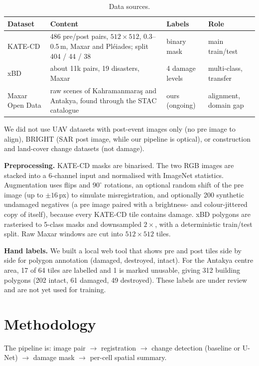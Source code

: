 \documentclass[14pt]{article}
\begin{document}
\begin{table}[H]
\centering\small
\caption{Data sources.}\label{tab:data}
\begin{tabularx}{\linewidth}{@{}lXll@{}}
\toprule
Dataset & Content & Labels & Role\\
\midrule
KATE-CD & 486 pre/post pairs, $512{\times}512$, 0.3--0.5\,m, Maxar and Pl\'eiades; split 404 / 44 / 38 & binary mask & main train/test\\
xBD & about 11k pairs, 19 disasters, Maxar & 4 damage levels & multi-class, transfer\\
Maxar Open Data & raw scenes of Kahramanmara\c{s} and Antakya, found through the STAC catalogue & ours (ongoing) & alignment, domain gap\\
\bottomrule
\end{tabularx}
\end{table}

We did not use UAV datasets with post-event images only (no pre image to align), BRIGHT (SAR post image, while our pipeline is optical), or construction and land-cover change datasets (not damage).

\textbf{Preprocessing.} KATE-CD masks are binarised. The two RGB images are stacked into a 6-channel input and normalised with ImageNet statistics. Augmentation uses flips and $90^\circ$ rotations, an optional random shift of the pre image (up to $\pm16$\,px) to simulate misregistration, and optionally 200 synthetic undamaged negatives (a pre image paired with a brightness- and colour-jittered copy of itself), because every KATE-CD tile contains damage. xBD polygons are rasterised to 5-class masks and downsampled $2\times$, with a deterministic train/test split. Raw Maxar windows are cut into $512{\times}512$ tiles.

\textbf{Hand labels.} We built a local web tool that shows pre and post tiles side by side for polygon annotation (damaged, destroyed, intact). For the Antakya centre area, 17 of 64 tiles are labelled and 1 is marked unusable, giving 312 building polygons (202 intact, 61 damaged, 49 destroyed). These labels are under review and are not yet used for training.

\section{Methodology}
The pipeline is: image pair $\rightarrow$ registration $\rightarrow$ change detection (baseline or U-Net) $\rightarrow$ damage mask $\rightarrow$ per-cell spatial summary.
\end{document}
